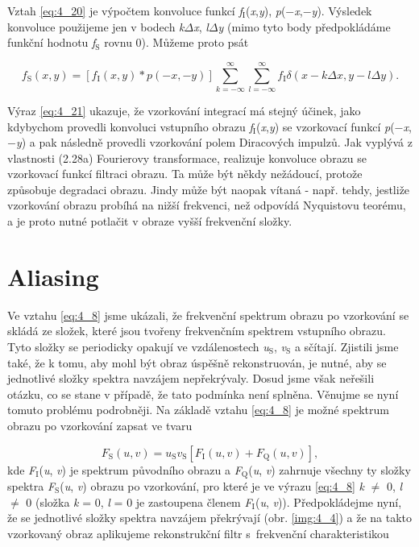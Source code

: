 Vztah \eqref{eq:4_20} je výpočtem konvoluce funkcí \textit{f}$_\mathrm{I}$(\textit{x},\textit{y}), \textit{p}($-$\textit{x},$-$\textit{y}). Výsledek konvoluce použijeme jen v bodech \textit{k}$\Delta$\textit{x}, \textit{l}$\Delta$\textit{y} (mimo tyto body předpokládáme funkční hodnotu \textit{f}$_\mathrm{S}$ rovnu 0). Můžeme proto psát

\begin{equation} \label{eq:4_21}
    f_\mathrm{S}(x, y) = \left[ f_\mathrm{I}(x, y) * p(-x, -y) \right] \sum\limits_{k=-\infty}^{\infty} \sum\limits_{l=-\infty}^{\infty} f_\mathrm{I} \delta( x - k\Delta x, y - l\Delta y).
\end{equation}

Výraz \eqref{eq:4_21} ukazuje, že vzorkování integrací má stejný účinek, jako kdybychom provedli konvoluci vstupního obrazu \textit{f}$_\mathrm{I}$(\textit{x},\textit{y}) se vzorkovací funkcí \textit{p}($-$\textit{x},$-$\textit{y}) a pak následně provedli vzorkování polem Diracových impulzů. Jak vyplývá z vlastnosti (2.28a) Fourierovy transformace, realizuje konvoluce obrazu se vzorkovací funkcí filtraci obrazu. Ta může být někdy nežádoucí, protože způsobuje degradaci obrazu. Jindy může být naopak vítaná - např. tehdy, jestliže vzorkování obrazu probíhá na nižší frekvenci, než odpovídá Nyquistovu teorému, a je proto nutné potlačit v obraze vyšší frekvenční složky.

\section*{Aliasing} \label{sec:aliasing}

Ve vztahu \eqref{eq:4_8} jsme ukázali, že frekvenční spektrum obrazu po vzorkování se skládá ze složek, které jsou tvořeny frekvenčním spektrem vstupního obrazu. Tyto složky se periodicky opakují ve vzdálenostech \textit{u}$_\mathrm{S}$, \textit{v}$_\mathrm{S}$ a sčítají. Zjistili jsme také, že k tomu, aby mohl být obraz úspěšně rekonstruován, je nutné, aby se jednotlivé složky spektra navzájem nepřekrývaly. Dosud jsme však neřešili otázku, co se stane v případě, že tato podmínka není splněna. Věnujme se nyní tomuto problému podrobněji. Na základě vztahu \eqref{eq:4_8} je možné spektrum obrazu po vzorkování zapsat ve tvaru

\begin{equation} \label{eq:4_22}
    F_\mathrm{S}(u, v) = u_\mathrm{S} v_\mathrm{S} \left[ F_\mathrm{I}(u, v) + F_\mathrm{Q}(u, v) \right],
\end{equation}
kde \textit{F}$_\mathrm{I}$(\textit{u}, \textit{v}) je spektrum původního obrazu a \textit{F}$_\mathrm{Q}$(\textit{u}, \textit{v}) zahrnuje všechny ty složky spektra \textit{F}$_\mathrm{S}$(\textit{u}, \textit{v}) obrazu po vzorkování, pro které je ve výrazu \eqref{eq:4_8} \textit{k} $\neq$ 0, \textit{l} $\neq$ 0 (složka \textit{k} = 0, \textit{l} = 0 je zastoupena členem \textit{F}$_\mathrm{I}$(\textit{u}, \textit{v})). Předpokládejme nyní, že se jednotlivé složky spektra navzájem překrývají (obr. \ref{img:4_4}) a že na takto vzorkovaný obraz aplikujeme rekonstrukční filtr s~frekvenční charakteristikou

